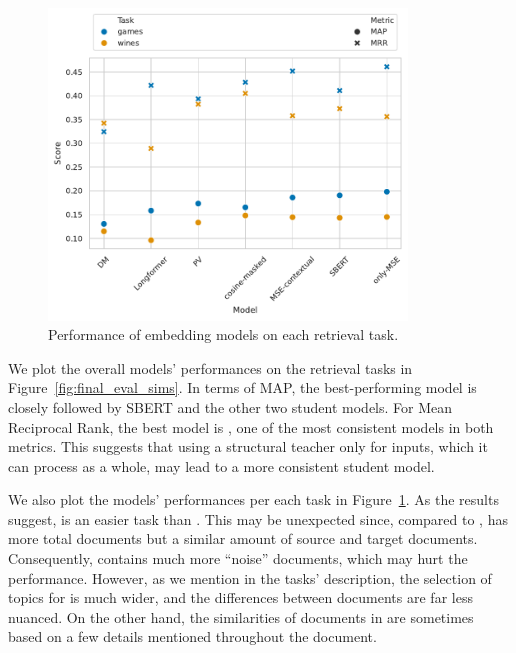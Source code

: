 \begin{figure}

  \centering
  \includegraphics[width=0.85\textwidth]{img/final_sims_evals_per_task.pdf}

  \caption{Performance of embedding models on each retrieval task.}

  \label{fig:final_eval_sims_per_task}

\end{figure}

We plot the overall models' performances on the retrieval tasks in
Figure~\ref{fig:final_eval_sims}. In terms of MAP, the best-performing model is
{\OnlyMSEStudent} closely followed by SBERT and the other two student models.
For Mean Reciprocal Rank, the best model is {\CosineStudent}, one
of the most consistent models in both metrics. This suggests that using
a structural teacher only for inputs, which it can process as a whole, may lead to a
more consistent student model.


We also plot the models' performances per each task in
Figure~\ref{fig:final_eval_sims_per_task}. As the results suggest, 
is an easier task than . This may be unexpected since, compared to
,  has more total documents but a similar amount of
source and target documents. Consequently,  contains much more
``noise'' documents, which may hurt the performance. However, as we mention in
the tasks' description, the selection of topics for  is much wider,
and the differences between documents are far less nuanced. On the other hand,
the similarities of documents in  are sometimes based on a few
details mentioned throughout the document.
